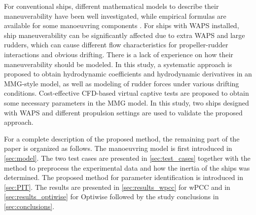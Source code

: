 For conventional ships, different mathematical models to describe their maneuverability have been well investigated, while empirical formulas are available for some manoeuvring components \citep{yasukawaIntroductionMMGStandard2015}. For ships with WAPS installed, ship maneuverability can be significantly affected due to extra WAPS and large rudders, which can cause different flow characteristics for propeller-rudder interactions and obvious drifting. There is a lack of experience on how their maneuverability should be modeled. In this study, a systematic approach is proposed to obtain hydrodynamic coefficients and hydrodynamic derivatives in an MMG-style model, as well as modeling of rudder forces under various drifting conditions. Cost-effective CFD-based virtual captive tests are proposed to obtain some necessary parameters in the MMG model. In this study, two ships designed with WAPS and different propulsion settings are used to validate the proposed approach.

For a complete description of the proposed method, the remaining part of the paper is organized as follows. The manoeuvring model is first introduced in \autoref{sec:model}. The two test cases are presented in \autoref{sec:test_cases} together with the method to preprocess the experimental data and how the inertia of the ships was determined. The proposed method for parameter identification is introduced in \autoref{sec:PIT}. The results are presented in \autoref{sec:results_wpcc} for wPCC and in \autoref{sec:results_optiwise} for Optiwise followed by the study conclusions in \autoref{sec:conclusions}.




